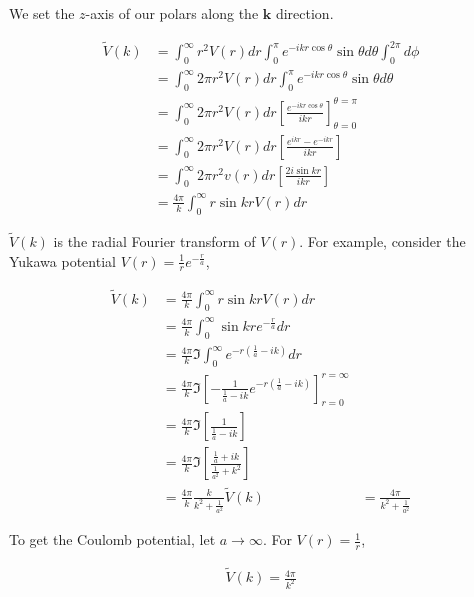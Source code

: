 \documentclass[11pt]{amsart}
\begin{document}
We set the $z$-axis of our polars along the $\mathbf{k}$ direction.

\begin{align*}
  \tilde{V}(k) &= \int_0^{\infty} r^2 V(r) dr \int_0^{\pi} e^{-ikr\cos{\theta}} \sin{\theta} d\theta \int_0^{2\pi} d\phi \\
               &= \int_0^{\infty} 2\pi r^2 V(r) dr \int_0^{\pi} e^{-ikr\cos{\theta}} \sin{\theta} d\theta \\
               &= \int_0^{\infty} 2\pi r^2 V(r) dr {\left[\frac{e^{-ikr\cos{\theta}}}{ikr}\right]}^{\theta = \pi}_{\theta = 0} \\
               &= \int_0^{\infty} 2\pi r^2 V(r) dr \left[\frac{e^{ikr} - e^{-ikr}}{ikr}\right] \\
               &= \int_0^{\infty} 2\pi r^2 v(r) dr \left[\frac{2i\sin{kr}}{ikr}\right] \\
               &= \frac{4\pi}{k}\int_0^{\infty} r\sin{kr} V(r) dr
\end{align*}


$\tilde{V}(k)$ is the radial Fourier transform of $V(r)$. For example, consider the Yukawa potential $V(r) = \frac{1}{r} e^{-\frac{r}{a}}$,

\begin{align*}
  \tilde{V}(k) &= \frac{4\pi}{k}\int_0^{\infty}r\sin{kr} V(r) dr \\
               &= \frac{4\pi}{k}\int_0^{\infty}\sin{kr} e^{-\frac{r}{a}} dr \\
               &= \frac{4\pi}{k} \Im \int_0^{\infty} e^{-r\left(\frac{1}{a}-ik\right)} dr \\
               &= \frac{4\pi}{k}\Im {\left[-\frac{1}{\frac{1}{a} - ik} e^{-r\left(\frac{1}{a} - ik\right)}\right]}_{r=0}^{r=\infty} \\
               &= \frac{4\pi}{k}\Im\left[\frac{1}{\frac{1}{a} - ik}\right] \\
               &= \frac{4\pi}{k}\Im\left[\frac{\frac{1}{a} + ik}{\frac{1}{a^2} + k^2}\right] \\
               &= \frac{4\pi}{k}\frac{k}{k^2 + \frac{1}{a^2}}
  \tilde{V}(k) &= \frac{4\pi}{k^2 + \frac{1}{a^2}}
\end{align*}

To get the Coulomb potential, let $a \to \infty$. For $V(r) = \frac{1}{r}$,

\begin{align*}
  \tilde{V}(k) = \frac{4\pi}{k^2}
\end{align*}
\end{document}
